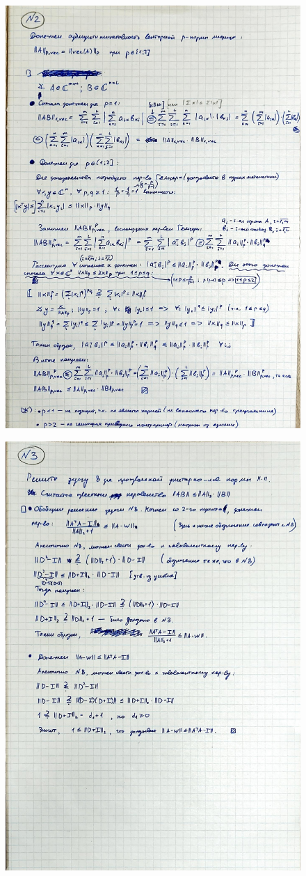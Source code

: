 \documentclass{article}
\begin{document}
	\begin{figure}[h!]
		\includegraphics[width=0.95\linewidth]{handwritten/matcomp_hw1_bonus_2}
	\end{figure}
	
	\begin{figure}[h!]
		\includegraphics[width=0.95\linewidth]{handwritten/matcomp_hw1_bonus_3}
	\end{figure}
\end{document}
